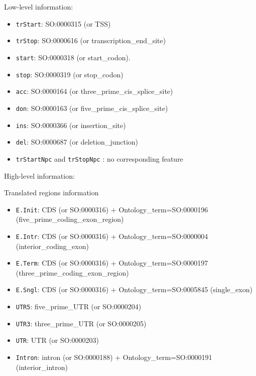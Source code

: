 Low-level information:
\begin{itemize}
\item \texttt{trStart}: 	SO:0000315 (or TSS)
\item \texttt{trStop}: 	SO:0000616 (or transcription\_end\_site)
\item \texttt{start}: 	SO:0000318 (or start\_codon).
\item \texttt{stop}: 	SO:0000319 (or stop\_codon)
\item \texttt{acc}: 	SO:0000164 (or three\_prime\_cis\_splice\_site)
\item \texttt{don}: 	SO:0000163 (or five\_prime\_cis\_splice\_site)
\item \texttt{ins}: 	SO:0000366 (or insertion\_site)
\item \texttt{del}: 	SO:0000687 (or deletion\_junction)
\item \texttt{trStartNpc} and \texttt{trStopNpc} : no corresponding feature
\end{itemize}

High-level information:

Translated regions information
\begin{itemize}
\item \texttt{E.Init}: CDS (or SO:0000316)                + Ontology\_term=SO:0000196 (five\_prime\_coding\_exon\_region)
\item \texttt{E.Intr}: CDS (or SO:0000316)                + Ontology\_term=SO:0000004 (interior\_coding\_exon)
\item \texttt{E.Term}: CDS (or SO:0000316)                + Ontology\_term=SO:0000197 (three\_prime\_coding\_exon\_region)
\item \texttt{E.Sngl}: CDS (or SO:0000316)                + Ontology\_term=SO:0005845 (single\_exon)
\item \texttt{UTR5}:   five\_prime\_UTR  (or SO:0000204)
\item \texttt{UTR3}:   three\_prime\_UTR (or SO:0000205)
\item \texttt{UTR}:    UTR (or SO:0000203)
\item \texttt{Intron}: intron (or SO:0000188)             + Ontology\_term=SO:0000191 (interior\_intron)
\end{itemize}

